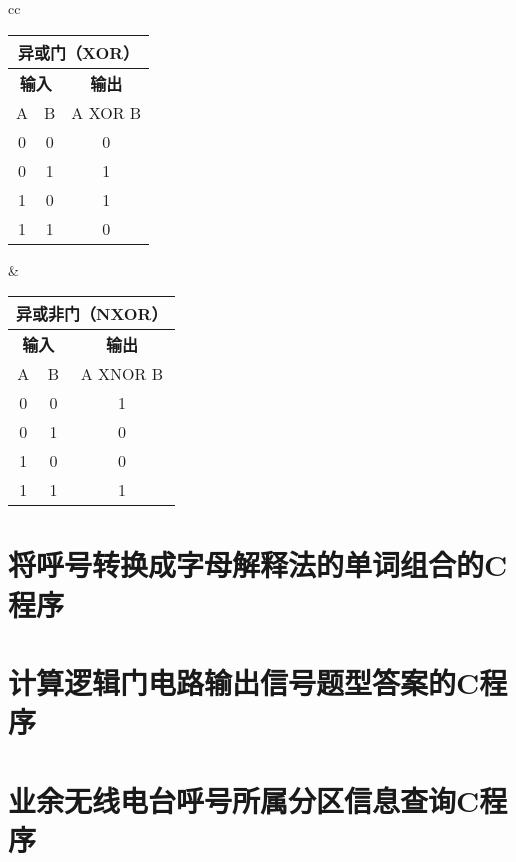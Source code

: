 \bigskip

\begin{tabular}{cc}%
	\begin{tabular}{|c|c|c|}
		\multicolumn{3}{c}{\textbf{异或门（XOR）}} \\
		\hline
		\multicolumn{2}{|c|}{\textbf{输入}} & \textbf{输出} \\
		\hline
		A & B & A XOR B \\
		\hline
		0 & 0 & 0 \\
		\hline
		0 & 1 & 1 \\
		\hline
		1 & 0 & 1 \\
		\hline
		1 & 1 & 0 \\
		\hline
	\end{tabular} &
	\begin{tabular}{|c|c|c|}
		\multicolumn{3}{c}{\textbf{异或非门（NXOR）}} \\
		\hline
		\multicolumn{2}{|c|}{\textbf{输入}} & \textbf{输出} \\
		\hline
		A & B & A XNOR B \\
		\hline
		0 & 0 & 1 \\
		\hline
		0 & 1 & 0 \\
		\hline
		1 & 0 & 0 \\
		\hline
		1 & 1 & 1 \\
		\hline
	\end{tabular} \tabularnewline
\end{tabular}

\newpage


\section{将呼号转换成字母解释法的单词组合的C程序}



\newpage


\section{计算逻辑门电路输出信号题型答案的C程序}



\newpage



\section{业余无线电台呼号所属分区信息查询C程序}

